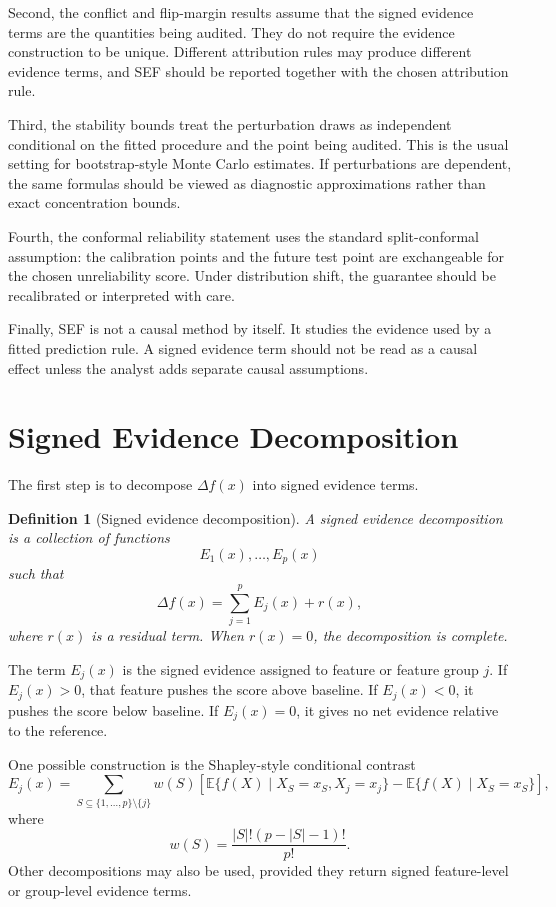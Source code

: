 \documentclass[11pt]{article}
\newtheorem{definition}{Definition}
\newcommand{\E}{\mathbb{E}}
\begin{document}
Second, the conflict and flip-margin results assume that the signed evidence terms are the quantities being audited. They do not require the evidence construction to be unique. Different attribution rules may produce different evidence terms, and SEF should be reported together with the chosen attribution rule.

Third, the stability bounds treat the perturbation draws as independent conditional on the fitted procedure and the point being audited. This is the usual setting for bootstrap-style Monte Carlo estimates. If perturbations are dependent, the same formulas should be viewed as diagnostic approximations rather than exact concentration bounds.

Fourth, the conformal reliability statement uses the standard split-conformal assumption: the calibration points and the future test point are exchangeable for the chosen unreliability score. Under distribution shift, the guarantee should be recalibrated or interpreted with care.

Finally, SEF is not a causal method by itself. It studies the evidence used by a fitted prediction rule. A signed evidence term should not be read as a causal effect unless the analyst adds separate causal assumptions.

\section{Signed Evidence Decomposition}

The first step is to decompose $\Delta f(x)$ into signed evidence terms.

\begin{definition}[Signed evidence decomposition]
A signed evidence decomposition is a collection of functions
\[
E_1(x),\ldots,E_p(x)
\]
such that
\[
\Delta f(x)=\sum_{j=1}^p E_j(x)+r(x),
\]
where $r(x)$ is a residual term. When $r(x)=0$, the decomposition is complete.
\end{definition}

The term $E_j(x)$ is the signed evidence assigned to feature or feature group $j$. If $E_j(x)>0$, that feature pushes the score above baseline. If $E_j(x)<0$, it pushes the score below baseline. If $E_j(x)=0$, it gives no net evidence relative to the reference.

One possible construction is the Shapley-style conditional contrast
\[
E_j(x)=
\sum_{S\subseteq \{1,\ldots,p\}\setminus \{j\}}
w(S)
\left[
\E\{f(X)\mid X_S=x_S,X_j=x_j\}
-
\E\{f(X)\mid X_S=x_S\}
\right],
\]
where
\[
w(S)=\frac{|S|!(p-|S|-1)!}{p!}.
\]
Other decompositions may also be used, provided they return signed feature-level or group-level evidence terms.
\end{document}
